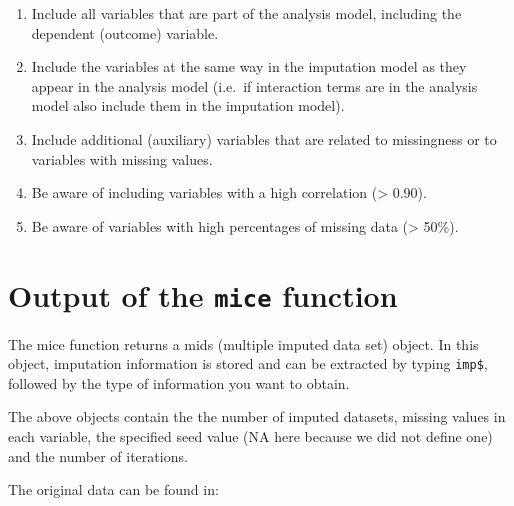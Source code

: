\documentclass[
]{book}
\newenvironment{Shaded}{\begin{snugshade}}{\end{snugshade}}
\newcommand{\NormalTok}[1]{#1}
\newcommand{\OperatorTok}[1]{\textcolor[rgb]{0.81,0.36,0.00}{\textbf{#1}}}
\providecommand{\tightlist}{%
  \setlength{\itemsep}{0pt}\setlength{\parskip}{0pt}}
\begin{document}
\begin{enumerate}
\def\labelenumi{\arabic{enumi}.}
\tightlist
\item
  Include all variables that are part of the analysis model, including the dependent (outcome) variable.
\item
  Include the variables at the same way in the imputation model as they appear in the analysis model (i.e.~if interaction terms are in the analysis model also include them in the imputation model).
\item
  Include additional (auxiliary) variables that are related to missingness or to variables with missing values.
\item
  Be aware of including variables with a high correlation (\textgreater{} 0.90).
\item
  Be aware of variables with high percentages of missing data (\textgreater{} 50\%).
\end{enumerate}

\hypertarget{output-of-the-mice-function}{%
\section{\texorpdfstring{Output of the \texttt{mice} function}{Output of the mice function}}\label{output-of-the-mice-function}}

The mice function returns a mids (multiple imputed data set) object. In this object, imputation information is stored and can be extracted by typing \texttt{imp\$}, followed by the type of information you want to obtain.

\begin{Shaded}
\end{Shaded}

The above objects contain the the number of imputed datasets, missing values in each variable, the specified seed value (NA here because we did not define one) and the number of iterations.

The original data can be found in:

\begin{Shaded}
\end{Shaded}
\end{document}
